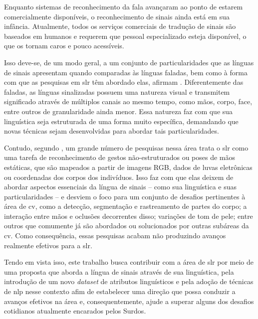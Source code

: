 \begin{citacao}
    Enquanto sistemas de reconhecimento da fala avançaram ao ponto de estarem comercialmente disponíveis, o reconhecimento de sinais ainda está em sua infância.
    Atualmente, todos os serviços comerciais de tradução de sinais são baseados em humanos e requerem que pessoal especializado esteja disponível, o que os tornam caros e pouco acessíveis. \cite[tradução nossa]{cooper-2011-slr}
\end{citacao}



Isso deve-se, de um modo geral, a um conjunto de particularidades que as línguas de sinais apresentam quando comparadas às línguas faladas, bem como à forma com que as pesquisas em \acrshort{slr} têm abordado elas, afirmam .
Diferentemente das faladas, as línguas sinalizadas possuem uma natureza visual e transmitem significado através de múltiplos canais ao mesmo tempo, como mãos, corpo, face, entre outros de granularidade ainda menor.
Essa natureza faz com que sua linguística seja estruturada de uma forma muito específica, demandando que novas técnicas sejam desenvolvidas para abordar tais particularidades.


Contudo, segundo , um grande número de pesquisas nessa área trata o \acrshort{slr} como uma tarefa de reconhecimento de gestos não-estruturados ou poses de mãos estáticas, que são mapeados a partir de imagens RGB, dados de luvas eletrônicas ou coordenadas dos corpos dos indivíduos.
Isso faz com que elas deixem de abordar aspectos essenciais da língua de sinais -- como sua linguística e suas particularidades -- e desviem o foco para um conjunto de desafios pertinentes à área de \acrfull{cv}, como a detecção, segmentação e rastreamento de partes do corpo; a interação entre mãos e oclusões decorrentes disso; variações de tom de pele; entre outros que comumente já são abordados ou solucionados por outras subáreas da \acrshort{cv}.
Como consequência, essas pesquisas acabam não produzindo avanços realmente efetivos para a \acrshort{slr}.


Tendo em vista isso, este trabalho busca contribuir com a área de \acrfull{slr} por meio de uma proposta que aborda a língua de sinais através de sua linguística, pela introdução de um novo \textit{dataset} de atributos linguísticos e pela adoção de técnicas de \acrfull{nlp} nesse contexto afim de estabelecer uma direção que possa conduzir a avanços efetivos na área e, consequentemente, ajude a superar alguns dos desafios cotidianos atualmente encarados pelos Surdos.

